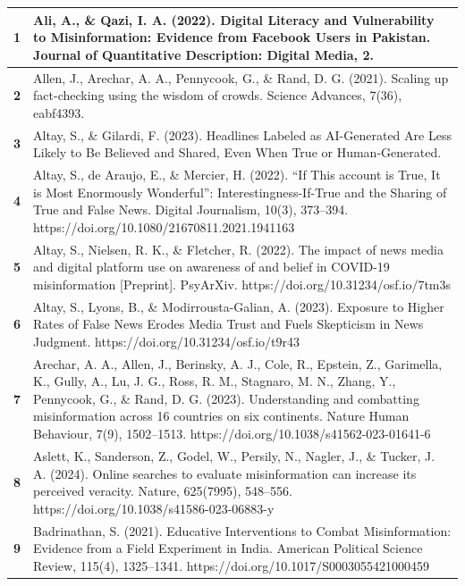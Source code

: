 \documentclass[
  doc,floatsintext]{apa6}
\begin{document}
\begin{longtable}[t]{>{}r||>{\raggedright\arraybackslash}p{30em}}
\hline
1 & Ali, A., \& Qazi, I. A. (2022). Digital Literacy and Vulnerability to Misinformation: Evidence from Facebook Users in Pakistan. Journal of Quantitative Description: Digital Media, 2.\\
\hline
\textbf{2} & Allen, J., Arechar, A. A., Pennycook, G., \& Rand, D. G. (2021). Scaling up fact-checking using the wisdom of crowds. Science Advances, 7(36), eabf4393.\\
\hline
\textbf{3} & Altay, S., \& Gilardi, F. (2023). Headlines Labeled as AI-Generated Are Less Likely to Be Believed and Shared, Even When True or Human-Generated.\\
\hline
\textbf{4} & Altay, S., de Araujo, E., \& Mercier, H. (2022). “If This account is True, It is Most Enormously Wonderful”: Interestingness-If-True and the Sharing of True and False News. Digital Journalism, 10(3), 373–394. https://doi.org/10.1080/21670811.2021.1941163\\
\hline
\textbf{5} & Altay, S., Nielsen, R. K., \& Fletcher, R. (2022). The impact of news media and digital platform use on awareness of and belief in COVID-19 misinformation [Preprint]. PsyArXiv. https://doi.org/10.31234/osf.io/7tm3s\\
\hline
\textbf{6} & Altay, S., Lyons, B., \& Modirrousta-Galian, A. (2023). Exposure to Higher Rates of False News Erodes Media Trust and Fuels Skepticism in News Judgment. https://doi.org/10.31234/osf.io/t9r43\\
\hline
\textbf{7} & Arechar, A. A., Allen, J., Berinsky, A. J., Cole, R., Epstein, Z., Garimella, K., Gully, A., Lu, J. G., Ross, R. M., Stagnaro, M. N., Zhang, Y., Pennycook, G., \& Rand, D. G. (2023). Understanding and combatting misinformation across 16 countries on six continents. Nature Human Behaviour, 7(9), 1502–1513. https://doi.org/10.1038/s41562-023-01641-6\\
\hline
\textbf{8} & Aslett, K., Sanderson, Z., Godel, W., Persily, N., Nagler, J., \& Tucker, J. A. (2024). Online searches to evaluate misinformation can increase its perceived veracity. Nature, 625(7995), 548–556. https://doi.org/10.1038/s41586-023-06883-y\\
\hline
\textbf{9} & Badrinathan, S. (2021). Educative Interventions to Combat Misinformation: Evidence from a Field Experiment in India. American Political Science Review, 115(4), 1325–1341. https://doi.org/10.1017/S0003055421000459\\

\end{longtable}
\end{document}
